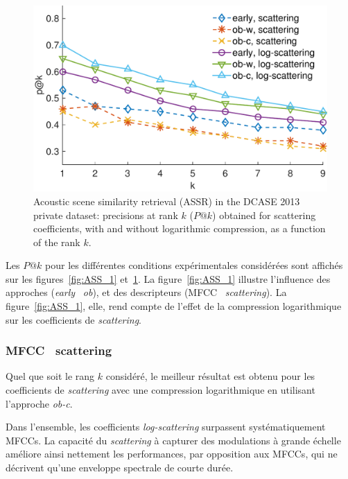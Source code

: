 \begin{figure}[t]
\begin{center}
\includegraphics[width=.9\columnwidth]{gfx/ch_8/unsupervised_test1-eps-converted-to}
\caption{Acoustic scene similarity retrieval (ASSR) in the DCASE 2013 private dataset: precisions at rank $k$ ($P@k$) obtained for scattering coefficients, with and without logarithmic compression, as a function of the rank $k$.}
\label{fig:ASS_2}
\end{center}
\end{figure}

Les $P@k$ pour les différentes conditions expérimentales considérées sont affichés sur les figures~\ref{fig:ASS_1} et~\ref{fig:ASS_2}.  La figure~\ref{fig:ASS_1} illustre l'influence des approches (\emph{early} \vs~\emph{ob}), et des descripteurs  (MFCC \vs~\emph{scattering}). La figure~\ref{fig:ASS_1}, elle, rend compte de l'effet de la compression logarithmique sur les coefficients de \emph{scattering}.

\subsubsection{MFCC \vs~scattering}


Quel que soit le rang $k$ considéré, le meilleur résultat est obtenu pour les coefficients de \emph{scattering} avec une compression logarithmique en utilisant l'approche \emph{ob-c}. 

Dans l'ensemble, les coefficients \emph{log-scattering} surpassent systématiquement MFCCs. La capacité du \emph{scattering} à capturer des modulations à grande échelle améliore ainsi nettement les performances, par opposition aux MFCCs, qui ne décrivent qu'une enveloppe spectrale de courte durée.\\

